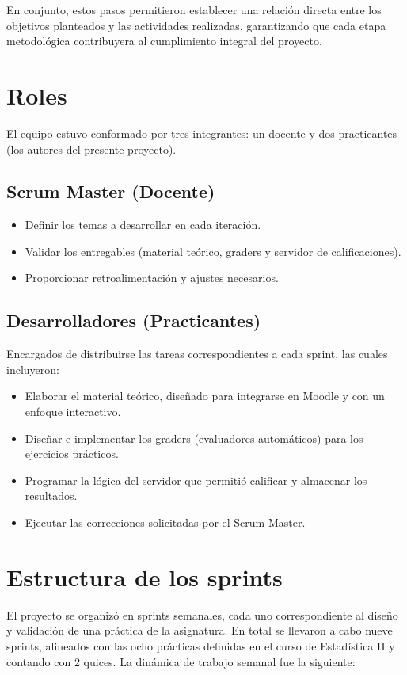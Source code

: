 \documentclass[letter,oneside,12pt,spanish]{report}
\begin{document}
En conjunto, estos pasos permitieron establecer una relación directa entre los objetivos planteados y las actividades realizadas, garantizando que cada etapa metodológica contribuyera al cumplimiento integral del proyecto.

\section{Roles}

El equipo estuvo conformado por tres integrantes: un docente y dos practicantes (los autores del presente proyecto).

\subsection*{Scrum Master (Docente)}
\begin{itemize}[leftmargin=*]
	\item Definir los temas a desarrollar en cada iteración.
	\item Validar los entregables (material teórico, graders y servidor de calificaciones).
	\item Proporcionar retroalimentación y ajustes necesarios.
\end{itemize}

\subsection*{Desarrolladores (Practicantes)}
Encargados de distribuirse las tareas correspondientes a cada sprint, las cuales incluyeron:
\begin{itemize}[leftmargin=*]
	\item Elaborar el material teórico, diseñado para integrarse en Moodle y con un enfoque interactivo.
	\item Diseñar e implementar los graders (evaluadores automáticos) para los ejercicios prácticos.
	\item Programar la lógica del servidor que permitió calificar y almacenar los resultados.
	\item Ejecutar las correcciones solicitadas por el Scrum Master.
\end{itemize}

\section{Estructura de los sprints}

El proyecto se organizó en sprints semanales, cada uno correspondiente al diseño y validación de una práctica de la asignatura. En total se llevaron a cabo nueve sprints, alineados con las ocho prácticas definidas en el curso de Estadística II y contando con 2 quices. La dinámica de trabajo semanal fue la siguiente:
\end{document}
